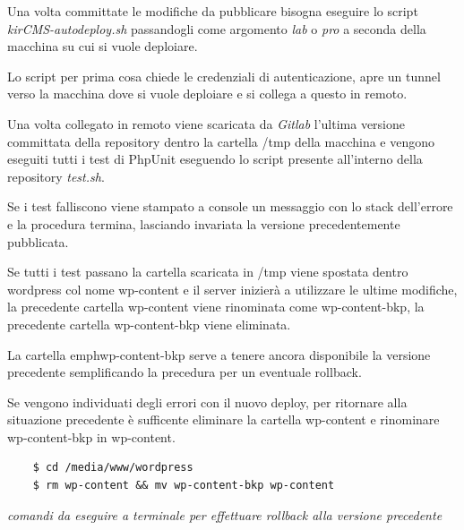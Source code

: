 Una volta committate le modifiche da pubblicare bisogna eseguire lo script \emph{kirCMS-autodeploy.sh} passandogli come argomento
\emph{lab} o \emph{pro} a seconda della macchina su cui si vuole deploiare.

Lo script per prima cosa chiede le credenziali di autenticazione, apre un tunnel verso la macchina dove si vuole deploiare e si collega a questo in remoto.

Una volta collegato in remoto viene scaricata da \emph{Gitlab} l'ultima versione committata della repository dentro la cartella /tmp
della macchina e vengono eseguiti tutti i test di PhpUnit eseguendo lo script presente all'interno della repository \emph{test.sh}.

Se i test falliscono viene stampato a console un messaggio con lo stack dell'errore e la procedura termina, lasciando invariata
la versione precedentemente pubblicata.

Se tutti i test passano la cartella scaricata in /tmp viene spostata dentro wordpress col nome wp-content e il server inizierà a
utilizzare le ultime modifiche, la precedente cartella wp-content viene rinominata come wp-content-bkp, la precedente cartella wp-content-bkp
viene eliminata.

La cartella emph{wp-content-bkp} serve a tenere ancora disponibile la versione precedente semplificando la precedura per un eventuale rollback. 

Se vengono individuati degli errori con il nuovo deploy, per ritornare alla situazione precedente è sufficente eliminare la cartella wp-content
e rinominare wp-content-bkp in wp-content.

\begin{verbatim}
	$ cd /media/www/wordpress 
	$ rm wp-content && mv wp-content-bkp wp-content
\end{verbatim}
\emph{comandi da eseguire a terminale per effettuare rollback alla versione precedente}

\newpage 

